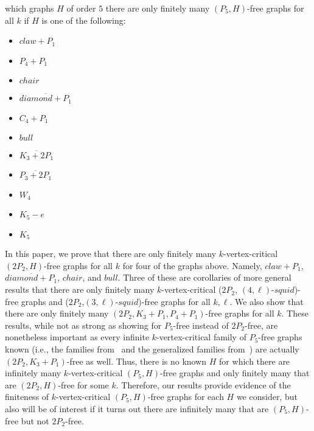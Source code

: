 \documentclass[11pt]{article}
\theoremstyle{definition}
\newcommand{\squid}[1]{$(4,#1)$-$squid$}
\newcommand{\hl}[1]{$(3,#1)$-$squid$}
\begin{document}
which graphs $H$ of order $5$ there are only finitely many $(P_5,H)$-free graphs for all $k$ if $H$ is one of the following:

\begin{multicols}{3}
\begin{itemize}
 \item $claw+P_1$
 \item $P_4+P_1$ 
  \item $chair$
 \item $\overline{diamond+P_1}$ 
 \item $C_4+P_1$
 \item $bull$ 
 \item $\overline{K_3+2P_1}$
 \item  $\overline{P_3+2P_1}$
 \item $W_4$
 \item $K_5-e$
 \item $K_5$
\end{itemize}
\end{multicols}




In this paper, we prove that there are only finitely many $k$-vertex-critical $(2P_2,H)$-free graphs for all $k$ for four of the graphs above. Namely,  $claw+P_1$,  $\overline{diamond+P_1}$, $chair$, and $bull$. Three of these are corollaries of more general results that there are only finitely many $k$-vertex-critical ($2P_2$, \squid{\ell})-free graphs and ($2P_2$,\hl{\ell})-free graphs for all $k,\ell$. We also show that there are only finitely many $(2P_2,K_3+P_1,P_4+P_1)$-free graphs for all $k$. These results, while not as strong as showing for $P_5$-free instead of $2P_2$-free, are nonetheless important as every infinite $k$-vertex-critical family of $P_5$-free graphs known (i.e., the families from~\cite{Hoang2015} and the generalized families from~\cite{CameronHoang2023P5C5}) are actually $(2P_2,K_3+P_1)$-free as well. Thus, there is no known $H$ for which there are infinitely many $k$-vertex-critical $(P_5,H)$-free graphs and only finitely many that are $(2P_2,H)$-free for some $k$. Therefore, our results provide evidence of the finiteness of $k$-vertex-critical $(P_5,H)$-free graphs for each $H$ we consider, but also will be of interest if it turns out there are infinitely many that are $(P_5,H)$-free but not $2P_2$-free.
\end{document}
